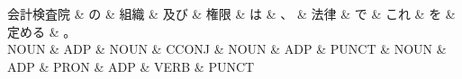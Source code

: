 \documentclass[tikz,border=5pt]{standalone}
\begin{document}
\normalsize
\begin{dependency}[edge unit distance=12.0pt]
    \begin{deptext}[column sep=1em]
        会計検査院 \& の \& 組織 \& 及び \& 権限 \& は \& 、 \& 法律 \& で \& これ \& を \& 定める \& 。\\
        NOUN \& ADP \& NOUN \& CCONJ \& NOUN \& ADP \& PUNCT \& NOUN \& ADP \& PRON \& ADP \& VERB \& PUNCT\\
    \end{deptext}
\end{dependency}
\end{document}
